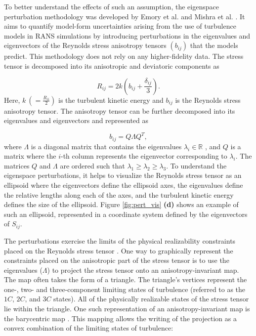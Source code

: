 To better understand the effects of such an assumption, the eigenspace perturbation methodology was developed by Emory et al. \cite{emory2013modeling} and Mishra et al. \cite{iaccarino_eig_pert}. 
It aims to quantify model-form uncertainties arising from the use of turbulence models in RANS simulations by introducing perturbations in the eigenvalues and eigenvectors of the Reynolds stress anisotropy tensors $\left ( b_{ij} \right )$ that the models predict. 
This methodology does not rely on any higher-fidelity data.
The stress tensor is decomposed into its anisotropic and deviatoric components as
 
\begin{equation}\label{equ:rst_decomp}
    R_{ij}=2k(b_{ij}+\frac{\delta_{ij}}{3}).
\end{equation}
Here, $k~(=\frac{R_{ii}}{2})$ is the turbulent kinetic energy and $b_{ij}$ is the Reynolds stress anisotropy tensor.
The anisotropy tensor can be further decomposed into its eigenvalues and eigenvectors and represented as

\begin{equation}\label{equ:eigendecomposition}
b_{ij}=Q \Lambda Q^T,
\end{equation}
where $\Lambda$ is a diagonal matrix that contains the eigenvalues $\lambda_i \in \mathbb{R}$ \cite{Gerolymos2016AlgebraicPA}, and $Q$ is a matrix where the $i$-th column represents the eigenvector corresponding to $\lambda_i$.
The matrices $Q$ and $\Lambda$ are ordered such that $\lambda_{1}\geq\lambda_{2}\geq\lambda_{3}$.
To understand the eigenspace perturbations, it helps to visualize the Reynolds stress tensor as an ellipsoid where the eigenvectors define the ellipsoid axes, the eigenvalues define the relative lengths along each of the axes, and the turbulent kinetic energy defines the size of the ellipsoid.
Figure \ref{fig:pert_vis} \textbf{(d)} shows an example of such an ellipsoid, represented in a coordinate system defined by the eigenvectors of $S_{ij}$. 

The perturbations exercise the limits of the physical realizability constraints placed on the Reynolds stress tensor \cite{schumann1977realizability,speziale1994realizability,2014realizability}.
One way to graphically represent the constraints placed on the anisotropic part of the stress tensor is to use the eigenvalues ($\Lambda$) to project the stress tensor onto an anisotropy-invariant map.
The map often takes the form of a triangle.
The triangle's vertices represent the one-, two- and three-component limiting states of turbulence (referred to as the $1C$, $2C$, and $3C$ states).
All of the physically realizable states of the stress tensor lie within the triangle.
One such representation of an anisotropy-invariant map is the barycentric map \cite{banerjee2007presentation}.
This mapping allows the writing of the projection as a convex combination of the limiting states of turbulence: 

